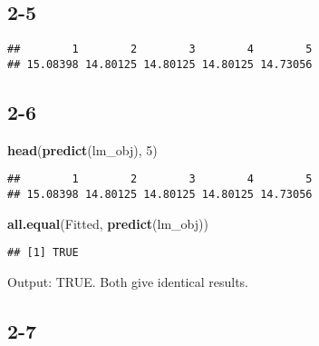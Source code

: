 \documentclass[
]{article}
\newenvironment{Shaded}{\begin{snugshade}}{\end{snugshade}}
\newcommand{\DecValTok}[1]{\textcolor[rgb]{0.00,0.00,0.81}{#1}}
\newcommand{\FunctionTok}[1]{\textcolor[rgb]{0.13,0.29,0.53}{\textbf{#1}}}
\newcommand{\NormalTok}[1]{#1}
\newcommand{\OtherTok}[1]{\textcolor[rgb]{0.56,0.35,0.01}{#1}}
\newcommand{\SpecialCharTok}[1]{\textcolor[rgb]{0.81,0.36,0.00}{\textbf{#1}}}
\begin{document}
\subsection{2-5}\label{section-8}

\begin{Shaded}
\end{Shaded}

\begin{verbatim}
##        1        2        3        4        5 
## 15.08398 14.80125 14.80125 14.80125 14.73056
\end{verbatim}

\subsection{2-6}\label{section-9}

\begin{Shaded}
\begin{Highlighting}[]
\FunctionTok{head}\NormalTok{(}\FunctionTok{predict}\NormalTok{(lm\_obj), }\DecValTok{5}\NormalTok{)}
\end{Highlighting}
\end{Shaded}

\begin{verbatim}
##        1        2        3        4        5 
## 15.08398 14.80125 14.80125 14.80125 14.73056
\end{verbatim}

\begin{Shaded}
\begin{Highlighting}[]
\FunctionTok{all.equal}\NormalTok{(Fitted, }\FunctionTok{predict}\NormalTok{(lm\_obj))}
\end{Highlighting}
\end{Shaded}

\begin{verbatim}
## [1] TRUE
\end{verbatim}

Output: TRUE. Both give identical results.

\subsection{2-7}\label{section-10}
\end{document}
